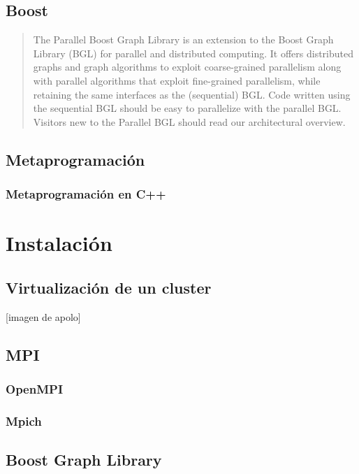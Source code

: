 \documentclass[twoside,letterpaper,12pt]{report}
\begin{document}
\section{Boost}

\begin{quotation}
The Parallel Boost Graph Library is an extension to the Boost Graph Library (BGL) for parallel and distributed computing. It offers distributed graphs and graph algorithms to exploit coarse-grained parallelism along with parallel algorithms that exploit fine-grained parallelism, while retaining the same interfaces as the (sequential) BGL. Code written using the sequential BGL should be easy to parallelize with the parallel BGL. Visitors new to the Parallel BGL should read our architectural overview.\cite{wwwboost} 
\end{quotation} 


\section{Metaprogramación}
\subsection{Metaprogramación en C++}


\chapter{Instalación}



\section{Virtualización de un cluster}[imagen de apolo]

\section{MPI}

\subsection{OpenMPI}
\subsection{Mpich}

\section{Boost Graph Library}
\end{document}
